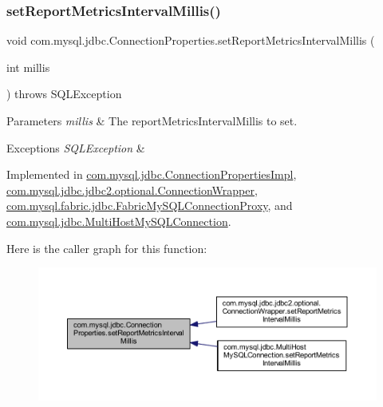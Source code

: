\subsubsection{\texorpdfstring{set\+Report\+Metrics\+Interval\+Millis()}{setReportMetricsIntervalMillis()}}
{\footnotesize\ttfamily void com.\+mysql.\+jdbc.\+Connection\+Properties.\+set\+Report\+Metrics\+Interval\+Millis (\begin{DoxyParamCaption}\item[{int}]{millis }\end{DoxyParamCaption}) throws S\+Q\+L\+Exception}


\begin{DoxyParams}{Parameters}
{\em millis} & The report\+Metrics\+Interval\+Millis to set. \\
\hline
\end{DoxyParams}

\begin{DoxyExceptions}{Exceptions}
{\em S\+Q\+L\+Exception} & \\
\hline
\end{DoxyExceptions}


Implemented in \mbox{\hyperlink{classcom_1_1mysql_1_1jdbc_1_1_connection_properties_impl_a828b72738e8e0e97d4695d6ac5c7c578}{com.\+mysql.\+jdbc.\+Connection\+Properties\+Impl}}, \mbox{\hyperlink{classcom_1_1mysql_1_1jdbc_1_1jdbc2_1_1optional_1_1_connection_wrapper_ac30ff270089a0b4903332b4b6e3b2f2d}{com.\+mysql.\+jdbc.\+jdbc2.\+optional.\+Connection\+Wrapper}}, \mbox{\hyperlink{classcom_1_1mysql_1_1fabric_1_1jdbc_1_1_fabric_my_s_q_l_connection_proxy_a5f80ae21093fc15d5d3c2a7c67d0ed64}{com.\+mysql.\+fabric.\+jdbc.\+Fabric\+My\+S\+Q\+L\+Connection\+Proxy}}, and \mbox{\hyperlink{classcom_1_1mysql_1_1jdbc_1_1_multi_host_my_s_q_l_connection_a5b8ccf72b52a8a23618696f6167bbf89}{com.\+mysql.\+jdbc.\+Multi\+Host\+My\+S\+Q\+L\+Connection}}.

Here is the caller graph for this function\+:\nopagebreak
\begin{figure}[H]
\begin{center}
\leavevmode
\includegraphics[width=350pt]{interfacecom_1_1mysql_1_1jdbc_1_1_connection_properties_a98e28b386c63acdab88d1fdc0531d8ce_icgraph}
\end{center}
\end{figure}
\mbox{\label{interfacecom_1_1mysql_1_1jdbc_1_1_connection_properties_a8ed305ab3368867b5a6cc1cc0bf67ba2}} 
